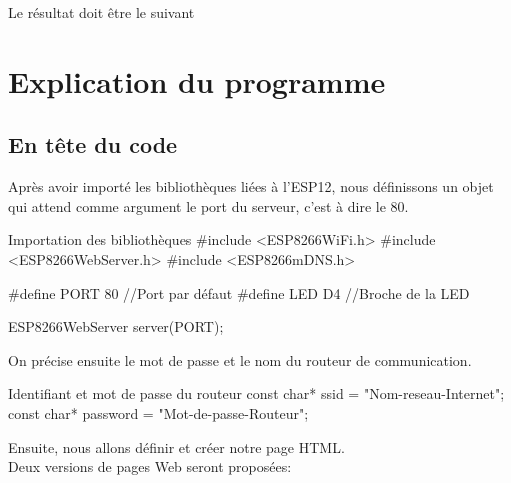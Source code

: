 Le résultat doit être le suivant \\


\section{Explication du programme}


\subsection{En tête du code}

Après avoir importé les bibliothèques liées à l'ESP12, nous définissons un objet  qui attend comme argument le port du serveur, c'est à dire le 80.
\begin{Cpp}{Importation des bibliothèques}
#include <ESP8266WiFi.h>
#include <ESP8266WebServer.h>
#include <ESP8266mDNS.h>
        
#define PORT 80 //Port par défaut
#define LED D4  //Broche de la LED
        
ESP8266WebServer server(PORT);
\end{Cpp}


On précise ensuite le mot de passe et le nom du routeur de communication.

\begin{Cpp}{Identifiant et mot de passe du routeur}
const char* ssid     = "Nom-reseau-Internet";
const char* password = "Mot-de-passe-Routeur";
\end{Cpp}


Ensuite, nous allons définir et créer notre page HTML.\\

Deux versions de pages Web seront proposées:

